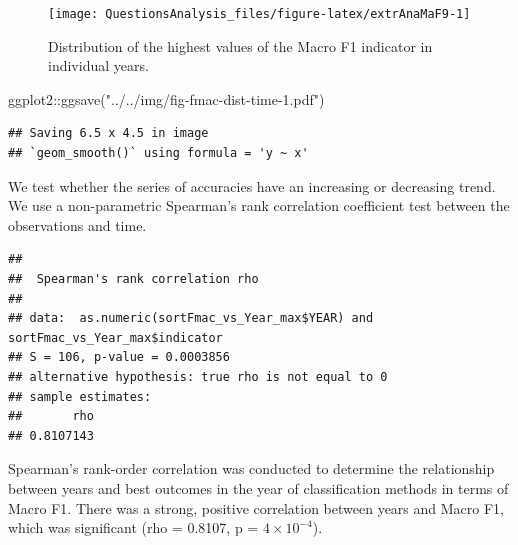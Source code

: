 \documentclass[
]{article}
\newenvironment{Shaded}{\begin{snugshade}}{\end{snugshade}}
\newcommand{\AttributeTok}[1]{\textcolor[rgb]{0.77,0.63,0.00}{#1}}
\newcommand{\FunctionTok}[1]{\textcolor[rgb]{0.00,0.00,0.00}{#1}}
\newcommand{\NormalTok}[1]{#1}
\newcommand{\OtherTok}[1]{\textcolor[rgb]{0.56,0.35,0.01}{#1}}
\newcommand{\SpecialCharTok}[1]{\textcolor[rgb]{0.00,0.00,0.00}{#1}}
\newcommand{\StringTok}[1]{\textcolor[rgb]{0.31,0.60,0.02}{#1}}
\begin{document}
\begin{figure}

{\centering \texttt{[image: QuestionsAnalysis\_files/figure-latex/extrAnaMaF9-1]} 

}

\caption{Distribution of the highest values of the Macro F1 indicator in individual years.}\label{fig:extrAnaMaF9}
\end{figure}

\begin{Shaded}
\begin{Highlighting}[]
\NormalTok{ggplot2}\SpecialCharTok{::}\FunctionTok{ggsave}\NormalTok{(}\StringTok{"../../img/fig{-}fmac{-}dist{-}time{-}1.pdf"}\NormalTok{)}
\end{Highlighting}
\end{Shaded}

\begin{verbatim}
## Saving 6.5 x 4.5 in image
## `geom_smooth()` using formula = 'y ~ x'
\end{verbatim}

We test whether the series of accuracies have an increasing or decreasing trend. We use a non-parametric Spearman's rank correlation coefficient test between the observations and time.

\begin{Shaded}
\end{Shaded}

\begin{verbatim}
## 
##  Spearman's rank correlation rho
## 
## data:  as.numeric(sortFmac_vs_Year_max$YEAR) and sortFmac_vs_Year_max$indicator
## S = 106, p-value = 0.0003856
## alternative hypothesis: true rho is not equal to 0
## sample estimates:
##       rho 
## 0.8107143
\end{verbatim}

Spearman's rank-order correlation was conducted to determine the relationship between years and best outcomes in the year of classification methods in terms of Macro F1. There was a strong, positive correlation between years and Macro F1, which was significant (rho = 0.8107, p = \ensuremath{4\times 10^{-4}}).
\end{document}
